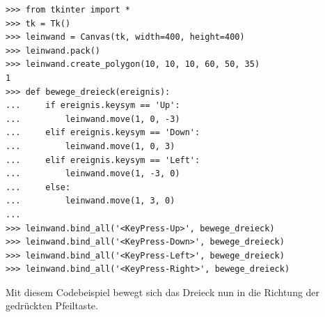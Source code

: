 \begin{Verbatim}[frame=single]
>>> from tkinter import *
>>> tk = Tk()
>>> leinwand = Canvas(tk, width=400, height=400)
>>> leinwand.pack()
>>> leinwand.create_polygon(10, 10, 10, 60, 50, 35)
1
>>> def bewege_dreieck(ereignis):
...     if ereignis.keysym == 'Up':
...         leinwand.move(1, 0, -3)
...     elif ereignis.keysym == 'Down':
...         leinwand.move(1, 0, 3)
...     elif ereignis.keysym == 'Left':
...         leinwand.move(1, -3, 0)
...     else:
...         leinwand.move(1, 3, 0)
...
>>> leinwand.bind_all('<KeyPress-Up>', bewege_dreieck)
>>> leinwand.bind_all('<KeyPress-Down>', bewege_dreieck)
>>> leinwand.bind_all('<KeyPress-Left>', bewege_dreieck)
>>> leinwand.bind_all('<KeyPress-Right>', bewege_dreieck)
\end{Verbatim}

\noindent
Mit diesem Codebeispiel bewegt sich das Dreieck nun in die Richtung der gedrückten Pfeiltaste.

\newpage
